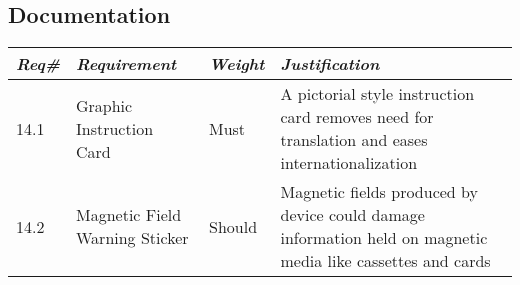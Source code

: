     \subsection{Documentation}
        \begin{centering}
        \begin{tabular}{|l|m{7cm}|l|m{7cm}|} \hline
        \textit{\textbf{Req\#}}	& \textit{\textbf{Requirement}} &\textit{\textbf{Weight}}&\textit{\textbf{Justification}} \\ \hline        
        14.1 & Graphic Instruction Card & Must & A pictorial style instruction card removes need for translation and eases internationalization  \\ \hline      
        14.2 & Magnetic Field Warning Sticker & Should & Magnetic fields produced by device could damage information held on magnetic media like cassettes and cards  \\ \hline     
        \end{tabular}
        \end{centering}
        

\newpage